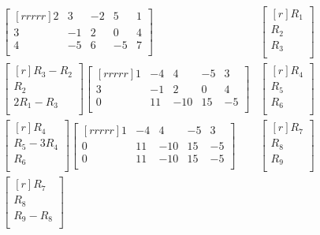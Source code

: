 \documentclass[12pt]{article}
\begin{document}
\begin{enumerate}
\begin{enumerate}
	\begin{align*}
	\begin{bmatrix}[rrrrr]
	2 & 3 & -2 & 5 & 1\\
	3 & -1 & 2 & 0 & 4\\
	4 & -5 & 6 & -5 & 7\\
	\end{bmatrix}&
	\begin{bmatrix}[r]
	R_1\\ R_2\\ R_3\\
	\end{bmatrix}\\
	\begin{bmatrix}[r]
	R_3 - R_2\\
	R_2\\
	2R_1 - R_3\\
	\end{bmatrix}
	\begin{bmatrix}[rrrrr]
	1 & -4 & 4 & -5 & 3\\
	3 & -1 & 2 & 0 & 4\\
	0 & 11 & -10 & 15 & -5\\
	\end{bmatrix}&
	\begin{bmatrix}[r]
	R_4\\ R_5\\ R_6\\
	\end{bmatrix}\\
	\begin{bmatrix}[r]
	R_4\\
	R_5 - 3R_4\\
	R_6\\
	\end{bmatrix}
	\begin{bmatrix}[rrrrr]
	1 & -4 & 4 & -5 & 3\\
	0 & 11 & -10 & 15 & -5\\
	0 & 11 & -10 & 15 & -5\\
	\end{bmatrix}&
	\begin{bmatrix}[r]
	R_7\\ R_8\\ R_9\\
	\end{bmatrix}\\
	\begin{bmatrix}[r]
	R_7\\
	R_8\\
	R_9 - R_8\\

\end{bmatrix}
\end{align*}
\end{enumerate}
\end{enumerate}
\end{document}
